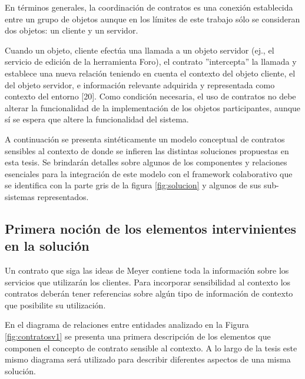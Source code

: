 {En términos generales, la coordinación de contratos es una conexión
establecida entre un grupo de objetos aunque en los límites de este trabajo sólo se consideran
dos objetos: un cliente y un servidor.

Cuando un objeto, cliente efectúa una llamada a un objeto servidor (ej., el
servicio de edición de la herramienta Foro), el contrato ”intercepta” la
llamada y establece una nueva relación teniendo en cuenta el contexto del
objeto cliente, el del objeto servidor, e información relevante adquirida
y representada como contexto del entorno [20]. Como condición necesaria, el uso
de contratos no debe alterar la funcionalidad de la implementación de los
objetos participantes, aunque sí se espera que altere la funcionalidad del
sistema.

A continuación se presenta sintéticamente un modelo conceptual de contratos sensibles
al contexto de donde se infieren las distintas soluciones propuestas en esta
tesis. Se brindarán detalles sobre algunos de los componentes y relaciones
esenciales para la integración de este modelo con el framework colaborativo que
se identifica con la parte gris de la figura \ref{fig:solucion} y algunos de
sus sub-sistemas representados.


\subsection{Primera noción de los elementos intervinientes en la solución}

Un contrato que siga las ideas de Meyer contiene toda la información
sobre los servicios que utilizarán los clientes. Para incorporar sensibilidad
al contexto los contratos deberán tener referencias sobre algún tipo de
información de contexto que posibilite su utilización.

En el diagrama de relaciones entre entidades analizado en la Figura
\ref{fig:contratosv1} se presenta una primera descripción de los elementos
que componen el concepto de contrato sensible al contexto. A lo largo de la
tesis este mismo diagrama será utilizado para describir diferentes aspectos de
una misma solución. 


}
